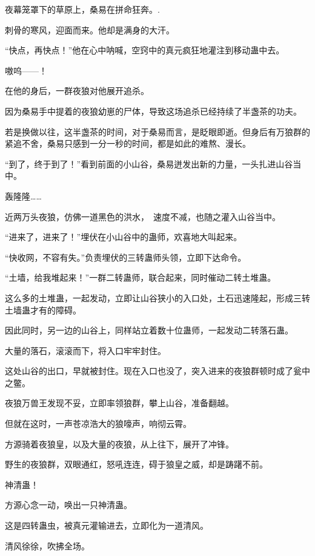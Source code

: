 
\begin{this_body}

夜幕笼罩下的草原上，桑易在拼命狂奔。.

刺骨的寒风，迎面而来。他却是满身的大汗。

“快点，再快点！”他在心中呐喊，空窍中的真元疯狂地灌注到移动蛊中去。

嗷呜——！

在他的身后，一群夜狼对他展开追杀。

因为桑易手中提着的夜狼幼崽的尸体，导致这场追杀已经持续了半盏茶的功夫。

若是换做以往，这半盏茶的时间，对于桑易而言，是眨眼即逝。但身后有万狼群的紧追不舍，桑易只感到一分一秒的时间，都是如此的难熬、漫长。

“到了，终于到了！”看到前面的小山谷，桑易迸发出新的力量，一头扎进山谷当中。

轰隆隆……

近两万头夜狼，仿佛一道黑色的洪水，　速度不减，也随之灌入山谷当中。

“进来了，进来了！”埋伏在小山谷中的蛊师，欢喜地大叫起来。

“快收网，不容有失。”负责埋伏的三转蛊师头领，立即下达命令。

“土墙，给我堆起来！”一群二转蛊师，联合起来，同时催动二转土堆蛊。

这么多的土堆蛊，一起发动，立即让山谷狭小的入口处，土石迅速隆起，形成三转土墙蛊才有的障碍。

因此同时，另一边的山谷上，同样站立着数十位蛊师，一起发动二转落石蛊。

大量的落石，滚滚而下，将入口牢牢封住。

这处山谷的出口，早就被封住。现在入口也没了，突入进来的夜狼群顿时成了瓮中之鳖。

夜狼万兽王发现不妥，立即率领狼群，攀上山谷，准备翻越。

但就在这时，一声苍凉浩大的狼嚎声，响彻云霄。

方源骑着夜狼皇，以及大量的夜狼，从上往下，展开了冲锋。

野生的夜狼群，双眼通红，怒吼连连，碍于狼皇之威，却是踌躇不前。

神清蛊！

方源心念一动，唤出一只神清蛊。

这是四转蛊虫，被真元灌输进去，立即化为一道清风。

清风徐徐，吹拂全场。


\end{this_body}
